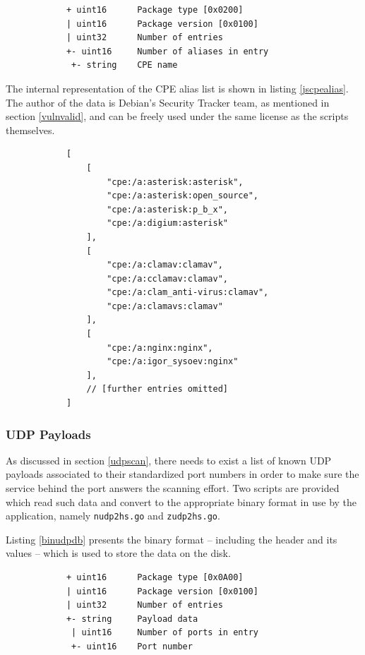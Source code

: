 \documentclass[a4paper,12pt]{article}
\begin{document}
	\begin{listing}[H]
		\begin{verbatim}
			+ uint16      Package type [0x0200]
			| uint16      Package version [0x0100]
			| uint32      Number of entries
			+- uint16     Number of aliases in entry
			 +- string    CPE name
		\end{verbatim}
		\caption{Binary format of the CPE alias list}
		\label{bincpealias}
	\end{listing}
	
	The internal representation of the CPE alias list is shown in listing \ref{jscpealias}. The author of the data is Debian's Security Tracker team, as mentioned in section \ref{vulnvalid}, and can be freely used under the same license as the scripts themselves. 
	
	\begin{listing}[H]
		\begin{verbatim}
			[
				[
					"cpe:/a:asterisk:asterisk",
					"cpe:/a:asterisk:open_source",
					"cpe:/a:asterisk:p_b_x",
					"cpe:/a:digium:asterisk"
				],
				[
					"cpe:/a:clamav:clamav",
					"cpe:/a:cclamav:clamav",
					"cpe:/a:clam_anti-virus:clamav",
					"cpe:/a:clamavs:clamav"
				],
				[
					"cpe:/a:nginx:nginx",
					"cpe:/a:igor_sysoev:nginx"
				],
				// [further entries omitted]
			]
		\end{verbatim}
		\caption{Approximate internal representation of the CPE alias list}
		\label{jscpealias}
	\end{listing}

\subsubsection{UDP Payloads} \label{datudp}
 

	As discussed in section \ref{udpscan}, there needs to exist a list of known UDP payloads associated to their standardized port numbers in order to make sure the service behind the port answers the scanning effort. Two scripts are provided which read such data and convert to the appropriate binary format in use by the application, namely \texttt{nudp2hs.go} and \texttt{zudp2hs.go}.
	
	Listing \ref{binudpdb} presents the binary format -- including the header and its values -- which is used to store the data on the disk.
	
	\begin{listing}[H]
		\begin{verbatim}
			+ uint16      Package type [0x0A00]
			| uint16      Package version [0x0100]
			| uint32      Number of entries
			+- string     Payload data
			 | uint16     Number of ports in entry
			 +- uint16    Port number
		\end{verbatim}
		\caption{Binary format of the UDP payload database}
		\label{binudpdb}
	\end{listing}
	
\end{document}
